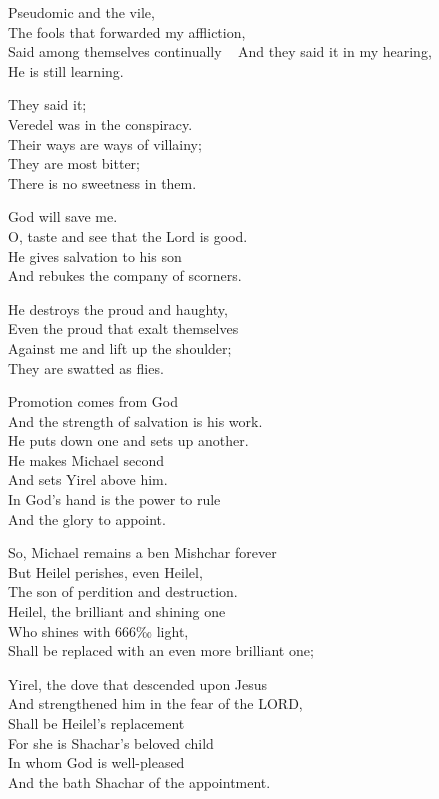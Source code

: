 \documentclass[
]{book}
\begin{document}
Pseudomic and the vile,\\
The fools that forwarded my affliction,\\
Said among themselves continually ~
And they said it in my hearing,\\
He is still learning.

They said it;\\
Veredel was in the conspiracy.\\
Their ways are ways of villainy;\\
They are most bitter;\\
There is no sweetness in them.

God will save me.\\
O, taste and see that the Lord is good.\\
He gives salvation to his son\\
And rebukes the company of scorners.

He destroys the proud and haughty,\\
Even the proud that exalt themselves\\
Against me and lift up the shoulder;\\
They are swatted as flies.

Promotion comes from God\\
And the strength of salvation is his work.\\
He puts down one and sets up another.\\
He makes Michael second\\
And sets Yirel above him.\\
In God's hand is the power to rule\\
And the glory to appoint.

So, Michael remains a ben Mishchar forever\\
But Heilel perishes, even Heilel,\\
The son of perdition and destruction.\\
Heilel, the brilliant and shining one\\
Who shines with 666‰ light,\\
Shall be replaced with an even more brilliant one;

Yirel, the dove that descended upon Jesus\\
And strengthened him in the fear of the LORD,\\
Shall be Heilel's replacement\\
For she is Shachar's beloved child\\
In whom God is well-pleased\\
And the bath Shachar of the appointment.
\end{document}
